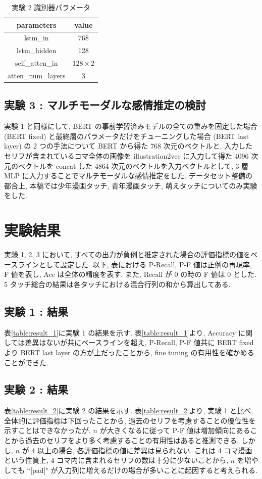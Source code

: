 \documentclass[twocolumn]{jarticle}     %
\begin{document}
\begin{table}[bht]
\begin{center}
\caption{実験 2 識別器パラメータ}
\begin{tabular}{|c|c|}
\hline
parameters & value \\ \hline
lstm\_in & 768   \\ \hline
lstm\_hidden    & 128    \\ \hline
self\_atten\_in & $128 \times 2$   \\ \hline
atten\_num\_layers & 3     \\ \hline
\end{tabular}
\label{tab:self_net}
\end{center}
\end{table}

\subsection{\small{実験 3 : マルチモーダルな感情推定の検討}}
実験 1 と同様にして, BERT の事前学習済みモデルの全ての重みを固定した場合 (BERT fixed) と最終層のパラメータだけをチューニングした場合 (BERT last layer) の 2 つの手法について BERT から得た 768 次元のベクトルと, 入力したセリフが含まれているコマ全体の画像を illustration2vec に入力して得た 4096 次元のベクトルを concat した 4864 次元のベクトルを入力ベクトルとして, 3 層 MLP に入力することでマルチモーダルな感情推定をした. データセット整備の都合上, 本稿では少年漫画タッチ, 青年漫画タッチ, 萌えタッチについてのみ実験をした.

\section{実験結果}
実験 1, 2, 3 において, すべての出力が負例と推定された場合の評価指標の値をベースラインとして設定した. 以下, 表における P-Recall, P-F 値は正例の再現率, F 値を表し, Acc は全体の精度を表す. また, Recall が 0 の時の F 値は 0 とした. 5 タッチ総合の結果は各タッチにおける混合行列の和から算出してある.

\subsection{実験 1 : 結果}
表\ref{table:result_1}に実験 1 の結果を示す.
表\ref{table:result_1}より, Accuracy に関しては差異はないが共にベースラインを超え, P-Recall, P-F 値共に BERT fixed より BERT last layer の方が上だったことから, fine tuning の有用性を確かめることができた.

\subsection{実験 2 : 結果}
表\ref{table:result_2}に実験 2 の結果を示す.
表\ref{table:result_2}より, 実験 1 と比べ, 全体的に評価指標は下回ったことから, 過去のセリフを考慮することの優位性を示すことはできなかったが, $n$ が大きくなるに従って P-F 値は増加傾向にあることから過去のセリフをより多く考慮することの有用性はあると推測できる. しかし, $n$ が 4 以上の場合, 各評価指標の値に差異は見られない. これは 4 コマ漫画という性質上, 4 コマ内に含まれるセリフの数は十分に少ないことから, $n$ を増やしても ``$[$pad$]$" が入力列に増えるだけの場合が多いことに起因すると考えられる.
\end{document}
